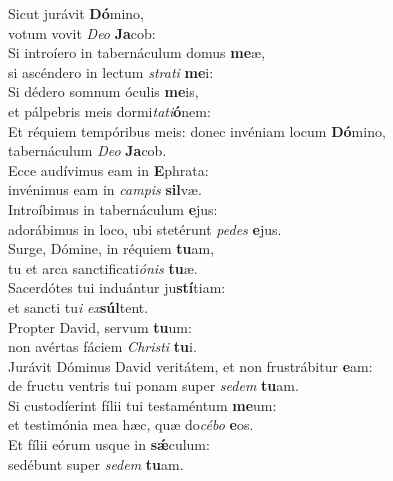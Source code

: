 \evenverse Sicut jurávit \textbf{Dó}mino,~\*\\
\evenverse votum vovit \textit{De}\textit{o} \textbf{Ja}cob:\\
\oddverse Si introíero in tabernáculum domus \textbf{me}æ,~\*\\
\oddverse si ascéndero in lectum \textit{stra}\textit{ti} \textbf{me}i:\\
\evenverse Si dédero somnum óculis \textbf{me}is,~\*\\
\evenverse et pálpebris meis dormi\textit{ta}\textit{ti}\textbf{ó}nem:\\
\oddverse Et réquiem tempóribus meis: donec invéniam locum \textbf{Dó}mino,~\*\\
\oddverse tabernáculum \textit{De}\textit{o} \textbf{Ja}cob.\\
\evenverse Ecce audívimus eam in \textbf{E}phrata:~\*\\
\evenverse invénimus eam in \textit{cam}\textit{pis} \textbf{sil}væ.\\
\oddverse Introíbimus in tabernáculum \textbf{e}jus:~\*\\
\oddverse adorábimus in loco, ubi stetérunt \textit{pe}\textit{des} \textbf{e}jus.\\
\evenverse Surge, Dómine, in réquiem \textbf{tu}am,~\*\\
\evenverse tu et arca sanctificati\textit{ó}\textit{nis} \textbf{tu}æ.\\
\oddverse Sacerdótes tui induántur ju\textbf{stí}tiam:~\*\\
\oddverse et sancti tu\textit{i} \textit{ex}\textbf{súl}tent.\\
\evenverse Propter David, servum \textbf{tu}um:~\*\\
\evenverse non avértas fáciem \textit{Chri}\textit{sti} \textbf{tu}i.\\
\oddverse Jurávit Dóminus David veritátem, et non frustrábitur \textbf{e}am:~\*\\
\oddverse de fructu ventris tui ponam super \textit{se}\textit{dem} \textbf{tu}am.\\
\evenverse Si custodíerint fílii tui testaméntum \textbf{me}um:~\*\\
\evenverse et testimónia mea hæc, quæ do\textit{cé}\textit{bo} \textbf{e}os.\\
\oddverse Et fílii eórum usque in \textbf{sǽ}culum:~\*\\
\oddverse sedébunt super \textit{se}\textit{dem} \textbf{tu}am.\\
